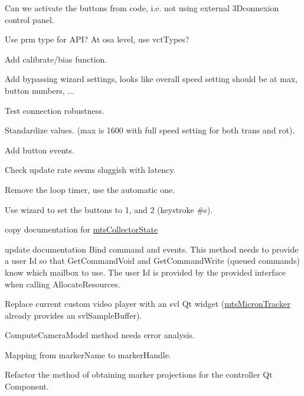 
\begin{DoxyRefList}
\item[\label{todo__todo000012}%
\hypertarget{todo__todo000012}{}%
File \hyperlink{mts3_dconnexion_8h}{mts3\+Dconnexion.h} ]Can we activate the buttons from code, i.\+e. not using external 3\+Dconnexion control panel. 

Use prm type for A\+P\+I? At osa level, use vct\+Types? 

Add calibrate/bias function. 

Add bypassing wizard settings, looks like overall speed setting should be at max, button numbers, ... 

Test connection robustness. 

Standardize values. (max is 1600 with full speed setting for both trans and rot). 

Add button events. 

Check update rate seems sluggish with latency. 

Remove the loop timer, use the automatic one. 

Use wizard to set the buttons to 1, and 2 (keystroke \#s).  
\item[\label{todo__todo000007}%
\hypertarget{todo__todo000007}{}%
Member \hyperlink{classmts_collector_event_a9e9b47581d6445e5f0c5a71f70afe8e7}{mts\+Collector\+Event\+:\+:Connect} (void)]copy documentation for \hyperlink{classmts_collector_state}{mts\+Collector\+State}  
\item[\label{todo__todo000008}%
\hypertarget{todo__todo000008}{}%
Member \hyperlink{classmts_interface_required_a8830a8a10b35d4a57396edbb4e328012}{mts\+Interface\+Required\+:\+:Add\+System\+Event\+Handlers} (void)]update documentation Bind command and events. This method needs to provide a user Id so that Get\+Command\+Void and Get\+Command\+Write (queued commands) know which mailbox to use. The user Id is provided by the provided interface when calling Allocate\+Resources.  
\item[\label{todo__todo000013}%
\hypertarget{todo__todo000013}{}%
File \hyperlink{mts_micron_tracker_8h}{mts\+Micron\+Tracker.h} ]Replace current custom video player with an svl Qt widget (\hyperlink{classmts_micron_tracker}{mts\+Micron\+Tracker} already provides an svl\+Sample\+Buffer). 

Compute\+Camera\+Model method needs error analysis. 

Mapping from marker\+Name to marker\+Handle. 

Refactor the method of obtaining marker projections for the controller Qt Component. 


\end{DoxyRefList}
